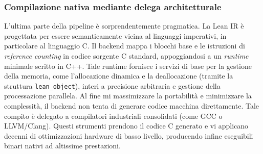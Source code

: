 \subsubsection{Compilazione nativa mediante delega architetturale}
L'ultima parte della pipeline è sorprendentemente pragmatica. La Lean IR è progettata per essere semanticamente vicina al linguaggi imperativi, in particolare al linguaggio C. Il backend mappa i blocchi base 
e le istruzioni di \textit{reference counting} in codice sorgente C standard, appoggiandosi a un \textit{runtime} minimale scritto in C++. Tale runtime fornisce i servizi di base per la gestione della memoria, 
come l'allocazione dinamica e la deallocazione (tramite la struttura \texttt{lean\_object}), interi a precisione arbitraria e gestione della processazione parallela. Al fine mi massimizzare la portabilità e 
minimizzare la complessità, il backend non tenta di generare codice macchina direttamente. Tale compito è delegato a compilatori industriali consolidati (come GCC o LLVM/Clang). Questi strumenti prendono il 
codice C generato e vi applicano decenni di ottimizzazioni hardware di basso livello, producendo infine eseguibili binari nativi ad altissime prestazioni.